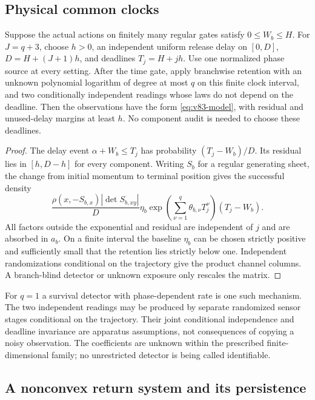 \subsection{Physical common clocks}

\begin{proposition}
\label{prop:v83-physical}
Suppose the actual actions on finitely many regular gates satisfy
$0\le W_b\le H$. For $J=q+3$, choose $h>0$, an independent
uniform release delay on $[0,D]$, $D=H+(J+1)h$, and deadlines
$T_j=H+jh$. Use one normalized phase source at every setting.
After the time gate, apply branchwise retention with an unknown
polynomial logarithm of degree at most $q$ on this finite clock
interval, and two conditionally independent readings whose laws do
not depend on the deadline. Then the observations have the form
\eqref{eq:v83-model}, with residual and unused-delay margins at
least $h$. No component audit is needed to choose these deadlines.
\end{proposition}
\begin{proof}
The delay event $\alpha+W_b\le T_j$ has probability
$(T_j-W_b)/D$. Its residual lies in $[h,D-h]$ for every component.
Writing $S_b$ for a regular generating sheet, the change from initial
momentum to terminal position gives the successful density
\[
 \frac{\rho(x,-S_{b,x})|\det S_{b,xy}|}{D}
     \eta_b\exp\left(\sum_{\nu=1}^q\theta_{b,\nu}T_j^\nu\right)
     (T_j-W_b).
\]
All factors outside the exponential and residual are independent of
$j$ and are absorbed in $a_b$. On a finite interval the baseline
$\eta_b$ can be chosen strictly positive and sufficiently small that
the retention lies strictly below one. Independent randomizations
conditional on the trajectory give the product channel columns.
A branch-blind detector or unknown exposure only rescales the matrix.
\end{proof}

For $q=1$ a survival detector with phase-dependent rate is one such
mechanism. The two independent readings may be produced by separate
randomized sensor stages conditional on the trajectory. Their joint
conditional independence and deadline invariance are apparatus
assumptions, not consequences of copying a noisy observation. The
coefficients are unknown within the prescribed finite-dimensional
family; no unrestricted detector is being called identifiable.

\subsection{A nonconvex return system and its persistence}

